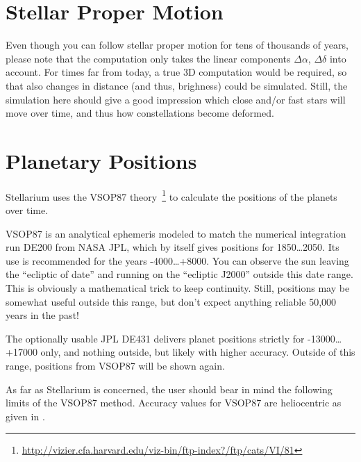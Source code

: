 \section{Stellar Proper Motion}
\label{sec:Accuracy:ProperMotion}

Even though you can follow stellar proper motion for tens of thousands of years, 
please note that the computation only takes the linear components $\Delta\alpha$, $\Delta\delta$ into account. 
For times far from today, a true 3D computation would be required, 
so that also changes in distance (and thus, brighness) could be simulated. 
Still, the simulation here should give a good impression which close and/or fast stars 
will move over time, and thus how constellations become deformed.


\section{Planetary Positions}
\label{sec:Accuracy:Planets}

Stellarium uses the VSOP87 theory~\cite{1988A&A...202..309B}\footnote{\url{http://vizier.cfa.harvard.edu/viz-bin/ftp-index?/ftp/cats/VI/81}}
to calculate the positions of the planets over time.

VSOP87 is an analytical ephemeris modeled to match the numerical
integration run DE200 from NASA JPL, which by itself gives positions for 1850\ldots2050. 
Its use is recommended for the years -4000\ldots+8000. You can observe the sun leaving the ``ecliptic
of date'' and running on the ``ecliptic J2000'' outside this date
range. This is obviously a mathematical trick to keep
continuity. Still, positions may be somewhat useful outside this
range, but don't expect anything reliable 50,000 years in the past! 

The optionally usable JPL DE431 delivers planet positions strictly for
-13000\ldots+17000 only, and nothing outside, but likely with higher accuracy. 
Outside of this range, positions from VSOP87 will be shown again.

As far as Stellarium is concerned, the user should bear in mind the
following limits of the VSOP87 method. Accuracy values for VSOP87 are
heliocentric as given in \cite{1988A&A...202..309B}.

